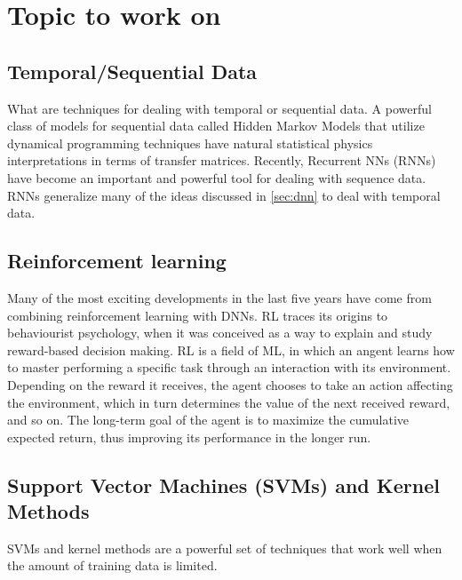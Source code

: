 \chapter{Topic to work on}
\section{Temporal/Sequential Data}
What are techniques for dealing with temporal or sequential data. A powerful class of models for sequential data called Hidden Markov Models that utilize dynamical programming techniques have natural statistical physics interpretations in terms of transfer matrices. Recently, Recurrent NNs (RNNs) have become an important and powerful tool for dealing with sequence data. RNNs generalize many of the ideas discussed in \ref{sec:dnn} to deal with temporal data.
\section{Reinforcement learning}
Many of the most exciting developments in the last five years have come from combining reinforcement learning with DNNs. RL traces its origins to behaviourist psychology, when it was conceived as a way to explain and study reward-based decision making. RL is a field of ML, in which an angent learns how to master performing a specific task through an interaction with its environment. Depending on the reward it receives, the agent chooses to take an action affecting the environment, which in turn determines the value of the next received reward, and so on. The long-term goal of the agent is to maximize the cumulative expected return, thus improving its performance in the longer run.

\section{Support Vector Machines (SVMs) and Kernel Methods}
SVMs and kernel methods are a powerful set of techniques that work well when the amount of training data is limited.

























